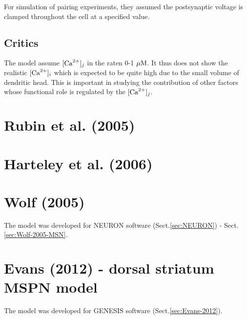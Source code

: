 For simulation of pairing experiments, they assumed the postsynaptic voltage is
clamped throughout the cell at a specified value.



\subsection{Critics}

The model assume $[{\text{Ca}^{2+}}]_j$ in the raten 0-1 ${\mu\text{M}}$. It thus does not show the
realistic $[{\text{Ca}^{2+}}]_i$ which is expected to be quite high due to the small volume
of dendritic head. This is important in studying the contribution of other
factors whose functional role is regulated by the $[{\text{Ca}^{2+}}]_j$.




\section{Rubin et al. (2005)}
\label{sec:Rubin-2005}

\section{Harteley et al. (2006)}
\label{sec:Harteley-2006}


\section{Wolf (2005)}


The model was developed for NEURON software (Sect.\ref{sec:NEURON}) -
Sect.\ref{sec:Wolf-2005-MSN}.


\section{Evans (2012) - dorsal striatum MSPN model}

The model was developed for GENESIS software (Sect.\ref{sec:Evans-2012}).
